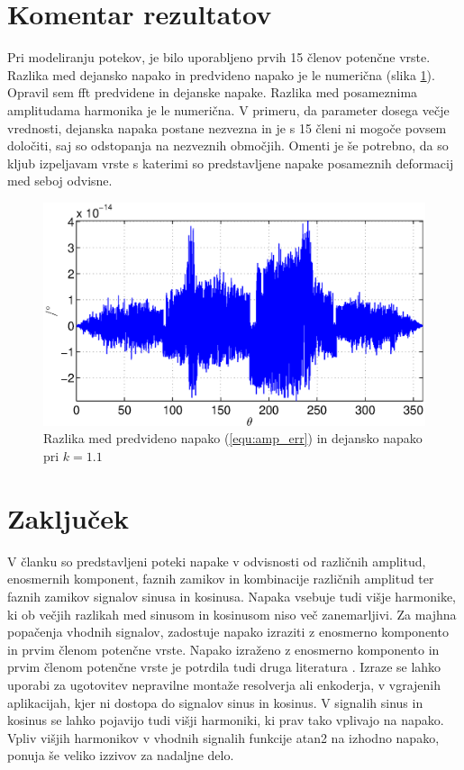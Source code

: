 \documentclass[a4paper]{article}
\begin{document}
\section{Komentar rezultatov}

Pri modeliranju potekov, je bilo uporabljeno prvih 15 členov potenčne vrste. Razlika med dejansko napako in predvideno napako je le numerična (slika \ref{fig:razlika}). Opravil sem fft predvidene in dejanske napake. Razlika med posameznima amplitudama harmonika je le numerična. V primeru, da parameter dosega večje vrednosti, dejanska napaka postane nezvezna in je s 15 členi ni mogoče povsem določiti, saj so odstopanja na nezveznih območjih. Omenti je še potrebno, da so kljub izpeljavam vrste s katerimi so predstavljene napake posameznih deformacij med seboj odvisne.

\begin{figure}[!htb]
	\begin{center}
		\includegraphics[width=\linewidth]{./Slike/razlika_amp.eps}
		\caption{Razlika med predvideno napako (\ref{equ:amp_err}) in dejansko napako pri $k=1.1$} \label{fig:razlika}
	\end{center}
\end{figure}




\section{Zaključek}

V članku so predstavljeni poteki napake v odvisnosti od različnih amplitud, enosmernih komponent, faznih zamikov in kombinacije različnih amplitud ter faznih zamikov signalov sinusa in kosinusa. Napaka vsebuje tudi višje harmonike, ki ob večjih razlikah med sinusom in kosinusom niso več zanemarljivi. Za majhna popačenja vhodnih signalov, zadostuje napako izraziti z enosmerno komponento in prvim členom potenčne vrste. Napako izraženo z enosmerno komponento in prvim členom potenčne vrste je potrdila tudi druga literatura \cite{RLS1}. Izraze se lahko uporabi za ugotovitev nepravilne montaže resolverja ali enkoderja, v vgrajenih aplikacijah, kjer ni dostopa do signalov sinus in kosinus. V signalih sinus in kosinus se lahko pojavijo tudi višji harmoniki, ki prav tako vplivajo na napako. Vpliv višjih harmonikov v vhodnih signalih funkcije atan2 na izhodno napako, ponuja še veliko izzivov za nadaljne delo.
\end{document}
